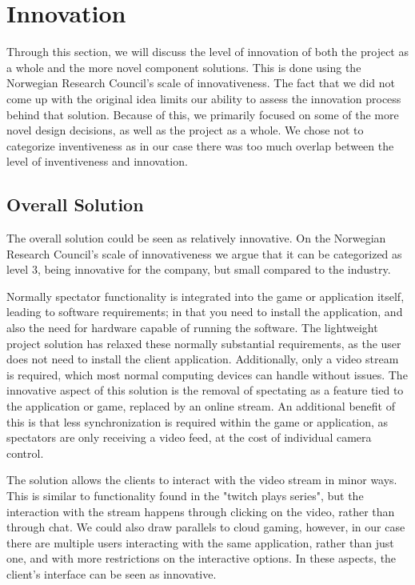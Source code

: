\section{Innovation}
Through this section, we will discuss the level of innovation of both the project as a whole and the more novel component solutions. This is done using the Norwegian Research Council's scale of innovativeness\cite{nrcs}.
The fact that we did not come up with the original idea limits our ability to assess the innovation process behind that solution. Because of this, we primarily focused on some of the more novel design decisions, as well as the project as a whole. We chose not to categorize inventiveness as in our case there was too much overlap between the level of inventiveness and innovation.

\subsection{Overall Solution}
The overall solution could be seen as relatively innovative. On the Norwegian Research Council's\cite{nrcs} scale of innovativeness we argue that it can be categorized as level 3, being innovative for the company, but small compared to the industry.

Normally spectator functionality is integrated into the game or application itself, leading to software requirements; in that you need to install the application, and also the need for hardware capable of running the software. The lightweight project solution has relaxed these normally substantial requirements, as the user does not need to install the client application. Additionally, only a video stream is required, which most normal computing devices can handle without issues. The innovative aspect of this solution is the removal of spectating as a feature tied to the application or game, replaced by an online stream. An additional benefit of this is that less synchronization is required within the game or application, as spectators are only receiving a video feed, at the cost of individual camera control.

The solution allows the clients to interact with the video stream in minor ways. This is similar to functionality found in the "twitch plays series"\cite{twitch_plays}, but the interaction with the stream happens through clicking on the video, rather than through chat. We could also draw parallels to cloud gaming, however, in our case there are multiple users interacting with the same application, rather than just one, and with more restrictions on the interactive options. In these aspects, the client's interface can be seen as innovative.

